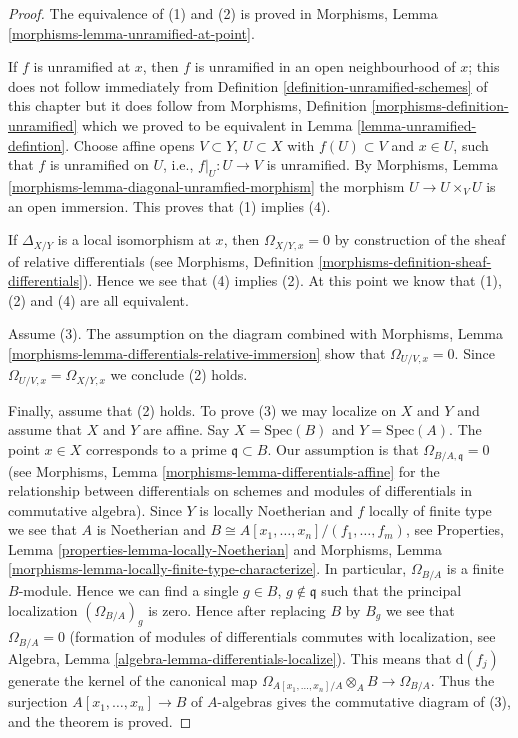 \begin{proof}
The equivalence of (1) and (2) is proved in
Morphisms, Lemma \ref{morphisms-lemma-unramified-at-point}.

\medskip\noindent
If $f$ is unramified at $x$, then $f$ is unramified in an open
neighbourhood of $x$; this does not follow immediately
from Definition \ref{definition-unramified-schemes} of this chapter
but it does follow from
Morphisms, Definition \ref{morphisms-definition-unramified} which we
proved to be equivalent in
Lemma \ref{lemma-unramified-defintion}.
Choose affine opens $V \subset Y$, $U \subset X$
with $f(U) \subset V$ and $x \in U$, such that $f$ is
unramified on $U$, i.e., $f|_U : U \to V$ is unramified.
By Morphisms, Lemma \ref{morphisms-lemma-diagonal-unramfied-morphism}
the morphism $U \to U \times_V U$
is an open immersion. This proves that (1) implies (4).

\medskip\noindent
If $\Delta_{X/Y}$ is a local isomorphism at $x$, then
$\Omega_{X/Y, x} = 0$ by construction of the sheaf of relative
differentials (see
Morphisms, Definition \ref{morphisms-definition-sheaf-differentials}).
Hence we see that (4) implies (2).
At this point we know that (1), (2) and (4) are all equivalent.

\medskip\noindent
Assume (3). The assumption on the diagram combined with
Morphisms, Lemma \ref{morphisms-lemma-differentials-relative-immersion}
show that $\Omega_{U/V, x} = 0$. Since $\Omega_{U/V, x} = \Omega_{X/Y, x}$
we conclude (2) holds.

\medskip\noindent
Finally, assume that (2) holds. To prove (3) we may localize on
$X$ and $Y$ and assume that $X$ and $Y$ are affine.
Say $X = \text{Spec}(B)$ and $Y = \text{Spec}(A)$.
The point $x \in X$ corresponds to a prime $\mathfrak q \subset B$.
Our assumption is that $\Omega_{B/A, \mathfrak q} = 0$
(see Morphisms, Lemma \ref{morphisms-lemma-differentials-affine} for the
relationship between differentials on schemes and modules
of differentials in commutative algebra).
Since $Y$ is locally Noetherian and $f$ locally of finite type
we see that $A$ is Noetherian and
$B \cong A[x_1, \ldots, x_n]/(f_1, \ldots, f_m)$, see
Properties, Lemma \ref{properties-lemma-locally-Noetherian} and
Morphisms, Lemma \ref{morphisms-lemma-locally-finite-type-characterize}.
In particular, $\Omega_{B/A}$ is a finite $B$-module. Hence we
can find a single $g \in B$, $g \not \in \mathfrak q$ such that
the principal localization $(\Omega_{B/A})_g$ is zero. Hence after
replacing $B$ by $B_g$ we see that $\Omega_{B/A} = 0$ (formation
of modules of differentials commutes with localization, see
Algebra, Lemma \ref{algebra-lemma-differentials-localize}). This means that
$\text{d}(f_j)$ generate the kernel of the canonical map
$\Omega_{A[x_1, \ldots, x_n]/A} \otimes_A B \to \Omega_{B/A}$.
Thus the surjection $A[x_1, \ldots, x_n] \to B$ of $A$-algebras gives the
commutative diagram of (3), and the theorem is proved.
\end{proof}

